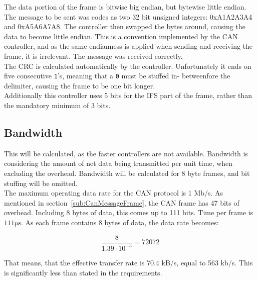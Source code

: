 The data portion of the frame is bitwise big endian, but bytewise little endian. 
The message to be sent was codes as two 32 bit unsigned integers: 0xA1A2A3A4 and 0xA5A6A7A8.
The controller then swapped the bytes around, causing the data to become little endian.
This is a convention implemented by the CAN controller, and as the same endianness is applied when sending and receiving the frame, it is irrelevant. 
The message was received correctly.\\

The CRC is calculated automatically by the controller.
Unfortunately it ends on five consecutive \texttt{1}'s, meaning that a \texttt{0} must be stuffed in- betweenfore the delimiter, causing the frame to be one bit longer.\\

Additionally this controller uses 5 bits for the IFS part of the frame, rather than the mandatory minimum of 3 bits. 

\subsection{Bandwidth}\label{sub:CAN_bandwidth}
This will be calculated, as the faster controllers are not available.
Bandwidth is considering the amount of net data being transmitted per unit time, when excluding the overhead.
Bandwidth will be calculated for 8 byte frames, and bit stuffing will be omitted.\\
                                                         
The maximum operating data rate for the CAN protocol is 1 Mb/s.
As mentioned in section~\ref{sub:CanMessageFrame}, the CAN frame has 47 bits of overhead. 
Including 8 bytes of data, this comes up to 111 bits. 
Time per frame is $111 \si{\micro\second}$.
As each frame contains 8 bytes of data, the data rate becomes:

\begin{equation}
\frac{8}{1.39 \cdot  10^{-5}}= 72072
\end{equation}

That means, that the effective transfer rate is 70.4 kB/s, equal to 563 kb/s.
This is significantly less than stated in the requirements.

